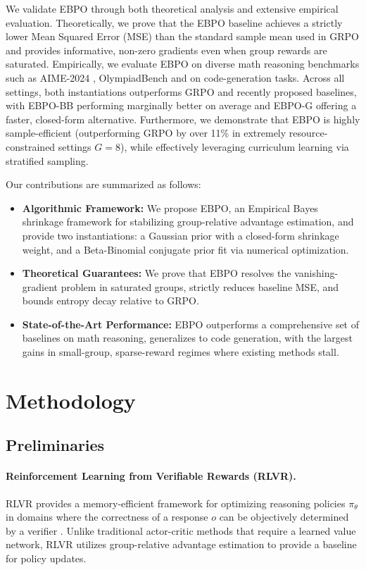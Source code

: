 \documentclass{article}
\theoremstyle{plain}
\theoremstyle{definition}
\theoremstyle{remark}
\newcommand{\oursG}{\textsc{EBPO-G}\xspace}
\newcommand{\oursBB}{\textsc{EBPO-BB}\xspace}
\begin{document}
We validate EBPO through both theoretical analysis and extensive empirical evaluation. Theoretically, we prove that the EBPO baseline achieves a strictly lower Mean Squared Error (MSE) than the standard sample mean used in GRPO and provides informative, non-zero gradients even when group rewards are saturated. Empirically, we evaluate EBPO on diverse math reasoning benchmarks such as AIME-2024 \citep{li2024numinamath}, OlympiadBench \citep{he2024olympiadbench} and on code-generation tasks. Across all settings, both instantiations outperforms GRPO and recently proposed baselines, with \oursBB performing marginally better on average and \oursG offering a faster, closed-form alternative. Furthermore, we demonstrate that EBPO is highly sample-efficient (outperforming GRPO by over 11\% in extremely resource-constrained settings $G=8$), while effectively leveraging curriculum learning via stratified sampling.

Our contributions are summarized as follows:
\begin{itemize}[leftmargin=*]
    \item \textbf{Algorithmic Framework:} We propose EBPO, an Empirical Bayes shrinkage framework for stabilizing group-relative advantage estimation, and provide two instantiations: a Gaussian prior with a closed-form shrinkage weight, and a Beta-Binomial conjugate prior fit via numerical optimization.
    \item \textbf{Theoretical Guarantees:} We prove that EBPO resolves the vanishing-gradient problem in saturated groups, strictly reduces baseline MSE, and bounds entropy decay relative to GRPO.
    \item \textbf{State-of-the-Art Performance:} EBPO outperforms a comprehensive set of baselines on math reasoning, generalizes to code generation, with the largest gains in small-group, sparse-reward regimes where existing methods stall. 
\end{itemize}

\section{Methodology}
\label{sec:method}

\subsection{Preliminaries}

\paragraph{Reinforcement Learning from Verifiable Rewards (RLVR).}
RLVR provides a memory-efficient framework for optimizing reasoning policies $\pi_\theta$ in domains where the correctness of a response $o$ can be objectively determined by a verifier \citep{shao2024deepseekmath}. Unlike traditional actor-critic methods that require a learned value network, RLVR utilizes group-relative advantage estimation to provide a baseline for policy updates.
\end{document}
